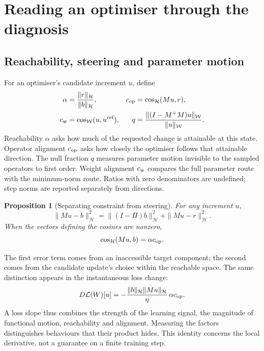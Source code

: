 \documentclass{article}
\newtheorem{proposition}{Proposition}
\theoremstyle{definition}
\theoremstyle{remark}
\begin{document}
\section{Reading an optimiser through the diagnosis}
\label{sec:diagnostics}

\subsection{Reachability, steering and parameter motion}

For an optimiser's candidate increment $u$, define
\begin{align}
 \alpha&=\frac{\|r\|_{\mathcal H}}{\|b\|_{\mathcal H}}, &
 c_{\rm op}&=\cos_{\mathcal H}(Mu,r),\nonumber\\
 c_{\rm w}&=\cos_{\mathcal W}(u,u^{\rm ref}), &
 q&=\frac{\|(I-M^+M)u\|_{\mathcal W}}{\|u\|_{\mathcal W}}.
 \label{eq:diagnostics}
\end{align}
Reachability $\alpha$ asks how much of the requested change is attainable at this state. Operator alignment $c_{\rm op}$ asks how closely the optimiser follows that attainable direction. The null fraction $q$ measures parameter motion invisible to the sampled operators to first order. Weight alignment $c_{\rm w}$ compares the full parameter route with the minimum-norm route. Ratios with zero denominators are undefined; step norms are reported separately from directions.

\begin{proposition}[Separating constraint from steering]
\label{prop:decomposition}
For any increment $u$,
\begin{equation}
 \|Mu-b\|_{\mathcal H}^2
 =\|(I-\Pi)b\|_{\mathcal H}^2+\|Mu-r\|_{\mathcal H}^2.
 \label{eq:decomposition}
\end{equation}
When the vectors defining the cosines are nonzero,
\begin{equation}
 \cos_{\mathcal H}(Mu,b)=\alpha c_{\rm op}.
 \label{eq:angle-factor}
\end{equation}
\end{proposition}
The first error term comes from an inaccessible target component; the second comes from the candidate update's choice within the reachable space. The same distinction appears in the instantaneous loss change:
\begin{equation}
 D\mathcal L(W)[u]
 =-\frac{\|b\|_{\mathcal H}\|Mu\|_{\mathcal H}}{\eta}\,\alpha c_{\rm op}.
 \label{eq:loss-diagnosis}
\end{equation}
A loss slope thus combines the strength of the learning signal, the magnitude of functional motion, reachability and alignment. Measuring the factors distinguishes behaviours that their product hides. This identity concerns the local derivative, not a guarantee on a finite training step.
\end{document}
